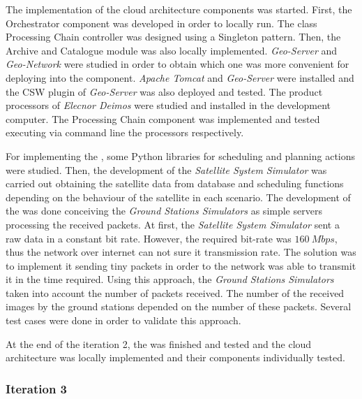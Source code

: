 The implementation of the cloud architecture components was started. First, the
Orchestrator component was developed in order to locally run. The class
Processing Chain controller was designed using a Singleton pattern. Then, the
Archive and Catalogue module was also locally implemented. \emph{Geo-Server} and
\emph{Geo-Network} were studied in order to obtain which one was more convenient
for deploying into the component. \emph{Apache Tomcat} and \emph{Geo-Server}
were installed and the \ac{CSW} plugin of \emph{Geo-Server} was also deployed
and tested.
The product processors of \emph{Elecnor Deimos} were studied and installed in
the development computer. The Processing Chain component was implemented and
tested executing
via command line the processors respectively.

For implementing the \sss, some Python libraries for scheduling and planning
actions were studied. Then, the development of the \emph{Satellite System
  Simulator} was carried out obtaining the satellite data from database and
scheduling functions depending on the behaviour of the satellite in each
scenario.
The development of the \gsss was done conceiving the \emph{Ground Stations
  Simulators} as simple servers processing the received packets.   
At first, the \emph{Satellite System Simulator}  sent a raw data in a constant
bit rate. However, the required bit-rate was $160~Mbps$, thus the network over internet
can not sure it transmission rate. The solution was to implement it sending tiny
packets in order to the network was able to transmit it in the time required.    
Using this approach, the \emph{Ground Stations
  Simulators} taken into account the number of packets received. The number of
the received images by the ground stations depended on
the number of these packets. Several test cases were done in order to validate
this approach.

At the end of the iteration 2, the \sss was finished and tested and the cloud
architecture was locally implemented and their components individually tested.
 
\subsubsection{Iteration 3}

